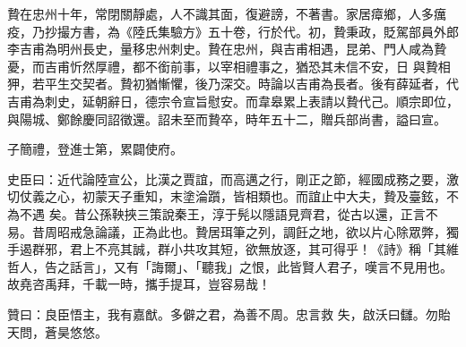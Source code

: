 \begin{pinyinscope}
 贄在忠州十年，常閉關靜處，人不識其面，復避謗，不著書。家居瘴鄉，人多癘疫，乃抄撮方書，為《陸氏集驗方》五十卷，行於代。初，贄秉政，貶駕部員外郎李吉甫為明州長史，量移忠州刺史。贄在忠州，與吉甫相遇，昆弟、門人咸為贄憂，而吉甫忻然厚禮，都不銜前事，以宰相禮事之，猶恐其未信不安，日
 與贄相狎，若平生交契者。贄初猶慚懼，後乃深交。時論以吉甫為長者。後有薛延者，代吉甫為刺史，延朝辭日，德宗令宣旨慰安。而韋皋累上表請以贄代己。順宗即位，與陽城、鄭餘慶同詔徵還。詔未至而贄卒，時年五十二，贈兵部尚書，謚曰宣。



 子簡禮，登進士第，累闢使府。



 史臣曰：近代論陸宣公，比漢之賈誼，而高邁之行，剛正之節，經國成務之要，激切仗義之心，初蒙天子重知，末塗淪躓，皆相類也。而誼止中大夫，贄及臺鉉，不為不遇
 矣。昔公孫鞅挾三策說秦王，淳于髡以隱語見齊君，從古以還，正言不易。昔周昭戒急論議，正為此也。贄居珥筆之列，調飪之地，欲以片心除眾弊，獨手遏群邪，君上不亮其誠，群小共攻其短，欲無放逐，其可得乎！《詩》稱「其維哲人，告之話言」，又有「誨爾」、「聽我」之恨，此皆賢人君子，嘆言不見用也。故堯咨禹拜，千載一時，攜手提耳，豈容易哉！



 贊曰：良臣悟主，我有嘉猷。多僻之君，為善不周。忠言救
 失，啟沃曰讎。勿貽天問，蒼昊悠悠。



\end{pinyinscope}